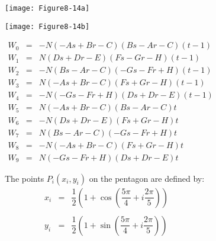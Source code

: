 \begin{description}[leftmargin=0cm,labelindent=0cm]
    \begin{figure}[!htb]
        \centering
        \begin{subfigure}{0.48\linewidth}
            \centering
            \texttt{[image: Figure8-14a]}
            \caption*{}
        \end{subfigure}
        \hfill
        \begin{subfigure}{0.48\linewidth}
            \centering
            \texttt{[image: Figure8-14b]}
            \caption*{}
        \end{subfigure}
        \hfill
        \begin{subfigure}{0.48\linewidth}
            \centering
            \begin{equation*}
            \begin{array}{lll}
            W_0 &=& -N(-As + Br - C)(Bs-Ar-C)(t - 1) \\
            W_1 &=& N(Ds+Dr-E)(Fs-Gr-H)(t-1) \\
            W_2 &=& -N(Bs -Ar -C)(-Gs-Fr+H)(t - 1)\\
            W_3 &=& N(-As + Br -C)(Fs + Gr - H)(t - 1) \\
            W_4 &=& -N(-Gs - Fr + H)(Ds + Dr - E)(t - 1) \\
            W_5 &=& N(-As +Br - C)(Bs -Ar -C)t \\
            W_6 &=& -N(Ds + Dr - E)(Fs + Gr - H)t\\
            W_7 &=& N(Bs - Ar -C)(-Gs -Fr + H)t \\
            W_8 &=& -N(-As + Br -C)(Fs + Gr - H)t \\
            W_9 &=& N(-Gs - Fr + H)(Ds + Dr -E)t
            \end{array}
            \end{equation*}
        \end{subfigure}%
        \hfill
        \begin{subfigure}{0.48\linewidth}
            \centering
            The points $P_i(x_i, y_i)$ on the pentagon are defined by:
            \begin{equation*}
            \begin{array}{lll}
            x_i &=& \dfrac{1}{2}\left(1 +\cos\left(\dfrac{5\pi}{4} + i \dfrac{2\pi}{5}\right)\right) \\ \\
            y_i &=& \dfrac{1}{2}\left(1 +\sin\left(\dfrac{5\pi}{4} + i \dfrac{2\pi}{5}\right)\right) \\ \\

\end{array}
\end{equation*}
\end{subfigure}
\end{figure}
\end{description}
